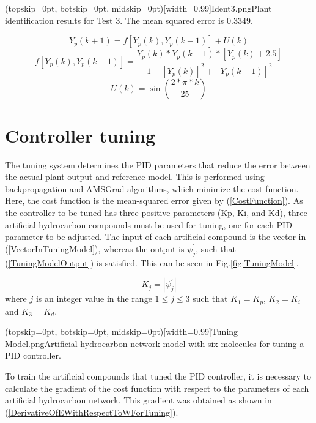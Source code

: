 \documentclass{ieeeaccess}
\begin{document}
\Figure[ht!](topskip=0pt, botskip=0pt, midskip=0pt)[width=0.99\columnwidth]{Ident3.png}{Plant identification results for Test 3. The mean squared error is 0.3349\label{fig:FigIdent3}.}

\begin{equation}\label{IdentTest3Equation1}
Y_p\left(k+1\right)=f\left[Y_p\left(k\right),Y_p\left(k-1\right)\right]+U\left(k\right)
\end{equation}
\begin{equation}\label{IdentTest3Equation2}
f\left[Y_p\left(k\right),Y_p\left(k-1\right)\right]=\frac{Y_p\left(k\right)\ast Y_p\left(k-1\right)\ast\left[Y_p\left(k\right)+2.5\right]}{1+\left[Y_p\left(k\right)\right]^2+\left[Y_p\left(k-1\right)\right]^2}
\end{equation}
\begin{equation}\label{IdentTest3Equation3}
U\left(k\right)=\sin{\left(\frac{2\ast\pi\ast k}{25}\right)}
\end{equation}


\section{Controller tuning}
\label{sec:tuning}

The tuning system determines the PID parameters that reduce the error between the actual plant output and reference model. This is performed using backpropagation and AMSGrad algorithms, which minimize the cost function. Here, the cost function is the mean-squared error given by (\ref{CostFunction}). As the controller to be tuned has three positive parameters (Kp, Ki, and Kd), three artificial hydrocarbon compounds must be used for tuning, one for each PID parameter to be adjusted. The input of each artificial compound is the vector in (\ref{VectorInTuningModel}), whereas the output is \(\psi_j^\prime\), such that (\ref{TuningModelOutput}) is satisfied. This can be seen in Fig.\ref{fig:TuningModel}.

\begin{equation}\label{TuningModelOutput}
K_j=|\psi_j^\prime|
\end{equation}
where \(j\) is an integer value in the range \(1\le j\le3\) such that \(K_1=K_p\), \(K_2=K_i\) and \(K_3=K_d\).

\Figure[ht!](topskip=0pt, botskip=0pt, midskip=0pt)[width=0.99\columnwidth]{Tuning Model.png}{Artificial hydrocarbon network model with six molecules for tuning a PID controller\label{fig:TuningModel}.}

To train the artificial compounds that tuned the PID controller, it is necessary to calculate the gradient of the cost function with respect to the parameters of each artificial hydrocarbon network. This gradient was obtained as shown in (\ref{DerivativeOfEWithRespectToWForTuning}).
\end{document}
